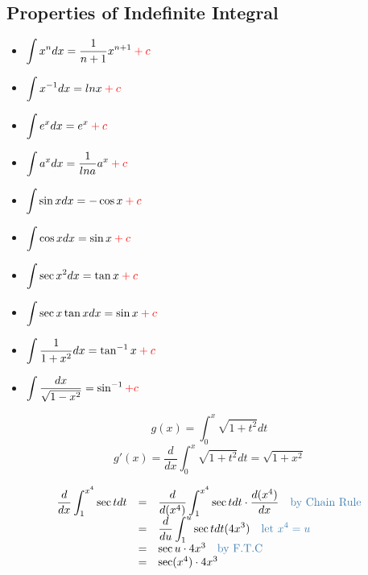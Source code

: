 \subsection*{Properties of Indefinite Integral}
\begin{itemize}
\item $\displaystyle \int x^n dx = \frac{1}{n+1} x^{n+1} \color{red}+ c$
\item $\displaystyle \int x^{-1} dx = ln x \color{red}+ c$
\item $\displaystyle \int e^x dx = e^x \color{red}+c$
\item $\displaystyle \int a^x dx =  \frac{1}{ln a} a^x \color{red}+ c$
\item $\displaystyle \int \sin x dx = - \cos x \color{red}+ c$
\item $\displaystyle \int \cos x dx = \sin x \color{red}+ c$
\item $\displaystyle \int \sec x^2 dx = \tan x \color{red}+ c$
\item $\displaystyle \int \sec x \tan x dx = \sin x \color{red}+ c$
\item $\displaystyle \int \frac{1}{1+x^2} dx =\tan ^{-1} x \color{red}+ c$
\item $\displaystyle \int \frac{dx}{\sqrt{1-x^2}} = \sin^{-1} \color{red}+ c$\\
\end{itemize}
\begin{eg}
$$\displaystyle g(x) = \int_0^x \sqrt{1+t^2} dt$$
$$\displaystyle g'(x) = \frac{d}{dx} \int_0^x \sqrt{1+t^2} dt = \sqrt{1+x^2}$$
\end{eg}
\begin{eg}
$$\begin{array}{rcl}
\displaystyle \frac{d}{dx} \int_1^{x^4} \sec t dt &= & \displaystyle \frac{d}{d(x^4)} \int_1^{x^4} \sec t dt \cdot \frac{d(x^4)}{dx} \quad \tssteelblue{\text{by Chain Rule}}\\
& = & \displaystyle \frac{d}{du} \int_1^u \sec t dt (4x^3) \quad \tssteelblue{\text{let } x^4 = u}\\
& = & \sec u \cdot 4x^3 \quad \tssteelblue{\text{by F.T.C}} \\
& = & \sec (x^4) \cdot 4x^3
\end{array}$$
\end{eg}
